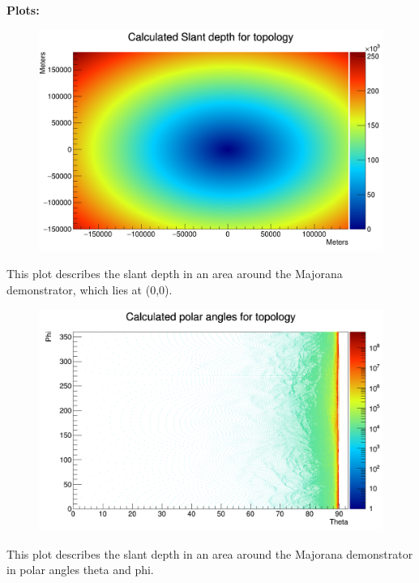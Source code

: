 \documentclass[a4paper,12pt]{article}
\begin{document}
\textbf{Plots:} \\

\begin{figure}[H]
\centering
\includegraphics[scale=0.3]{slantDepthTop.png}
\end{figure}

This plot describes the slant depth in an area around the Majorana demonstrator, which lies at (0,0).

\begin{figure}[H]
\centering
\includegraphics[scale=0.3]{polarAnglesTop.png}
\end{figure}

This plot describes the slant depth in an area around the Majorana demonstrator in polar angles theta and phi.
\end{document}
